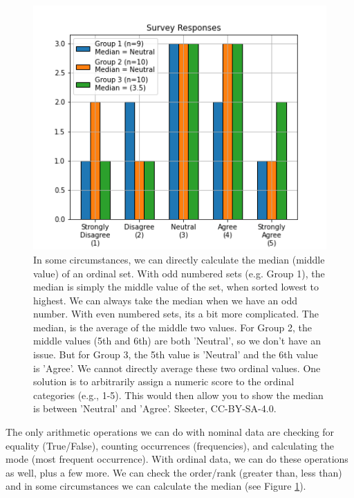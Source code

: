 \documentclass[
]{book}
\begin{document}
\begin{figure}
\includegraphics[width=0.75\linewidth]{images/03-ordinal-operations} \caption{In some circumstances, we can directly calculate the median (middle value) of an ordinal set. With odd numbered sets (e.g. Group 1), the median is simply the middle value of the set, when sorted lowest to highest. We can always take the median when we have an odd number.  With even numbered sets, its a bit more complicated.  The median, is the average of the middle two values. For Group 2, the middle values (5th and 6th) are both 'Neutral', so we don't have an issue. But for Group 3, the 5th value is 'Neutral' and the 6th value is 'Agree'. We cannot directly average these two ordinal values. One solution is to arbitrarily assign a numeric score to the ordinal categories (e.g., 1-5). This would then allow you to show the median is between 'Neutral' and 'Agree'. Skeeter, CC-BY-SA-4.0.}\label{fig:3-ordinal-operations}
\end{figure}

The only arithmetic operations we can do with nominal data are checking for equality (True/False), counting occurrences (frequencies), and calculating the mode (most frequent occurrence). With ordinal data, we can do these operations as well, plus a few more. We can check the order/rank (greater than, less than) and in some circumstances we can calculate the median (see Figure \ref{fig:3-ordinal-operations}).
\end{document}
